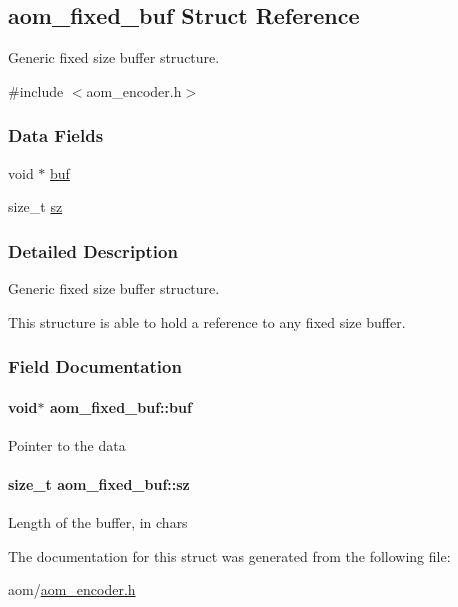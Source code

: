 \hypertarget{structaom__fixed__buf}{}\subsection{aom\+\_\+fixed\+\_\+buf Struct Reference}
\label{structaom__fixed__buf}


Generic fixed size buffer structure.  




{\ttfamily \#include $<$aom\+\_\+encoder.\+h$>$}

\subsubsection*{Data Fields}
\begin{DoxyCompactItemize}
\item 
void $\ast$ \hyperlink{structaom__fixed__buf_ac1b22da152c9839329d3780208dffd38}{buf}
\item 
size\+\_\+t \hyperlink{structaom__fixed__buf_a02f47e8b960c332c60a8aa4b7e37426f}{sz}
\end{DoxyCompactItemize}


\subsubsection{Detailed Description}
Generic fixed size buffer structure. 

This structure is able to hold a reference to any fixed size buffer. 

\subsubsection{Field Documentation}
\paragraph[{\texorpdfstring{buf}{buf}}]{\setlength{\rightskip}{0pt plus 5cm}void$\ast$ aom\+\_\+fixed\+\_\+buf\+::buf}\hypertarget{structaom__fixed__buf_ac1b22da152c9839329d3780208dffd38}{}\label{structaom__fixed__buf_ac1b22da152c9839329d3780208dffd38}
Pointer to the data 
\paragraph[{\texorpdfstring{sz}{sz}}]{\setlength{\rightskip}{0pt plus 5cm}size\+\_\+t aom\+\_\+fixed\+\_\+buf\+::sz}\hypertarget{structaom__fixed__buf_a02f47e8b960c332c60a8aa4b7e37426f}{}\label{structaom__fixed__buf_a02f47e8b960c332c60a8aa4b7e37426f}
Length of the buffer, in chars 

The documentation for this struct was generated from the following file\+:\begin{DoxyCompactItemize}
\item 
aom/\hyperlink{aom__encoder_8h}{aom\+\_\+encoder.\+h}\end{DoxyCompactItemize}
